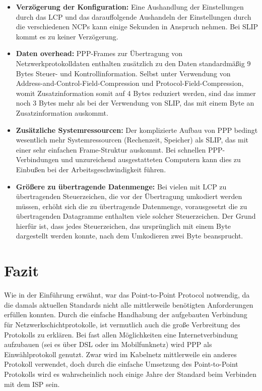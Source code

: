 \documentclass[journal,11pt]{IEEEtran}
\begin{document}
\begin{itemize}
\item \textbf{Verzögerung der Konfiguration:} Eine Aushandlung der Einstellungen durch das LCP und das darauffolgende Aushandeln der Einstellungen durch die verschiedenen NCPs kann einige Sekunden in Anspruch nehmen. Bei SLIP kommt es zu keiner Verzögerung.
\item \textbf{Daten overhead:} PPP-Frames zur Übertragung von Netzwerkprotokolldaten enthalten zusätzlich zu den Daten standardmäßig 9 Bytes Steuer- und Kontrollinformation. Selbst unter Verwendung von Address-and-Control-Field-Compression und Protocol-Field-Compression, womit Zusatzinformation somit auf 4 Bytes reduziert werden, sind das immer noch 3 Bytes mehr als bei der Verwendung von SLIP, das mit einem Byte an Zusatzinformation auskommt.
\item \textbf{Zusätzliche Systemressourcen:} Der komplizierte Aufbau von PPP bedingt wesentlich mehr Systemressourcen (Rechenzeit, Speicher) als SLIP, das mit einer sehr einfachen Frame-Struktur auskommt. Bei schnellen PPP-Verbindungen und unzureichend ausgestatteten Computern kann dies zu Einbußen bei der Arbeitsgeschwindigkeit führen.
\item \textbf{Größere zu übertragende Datenmenge:} Bei vielen mit LCP zu übertragenden Steuerzeichen, die vor der Übertragung umkodiert werden müssen, erhöht sich die zu übertragende Datenmenge, vorausgesetzt die zu übertragenden Datagramme enthalten viele solcher Steuerzeichen. Der Grund hierfür ist, dass jedes Steuerzeichen, das ursprünglich mit einem Byte dargestellt werden konnte, nach dem Umkodieren zwei Byte beansprucht. 
\end{itemize}
%
\section{Fazit} 
Wie in der Einf\"uhrung erw\"ahnt, war das Point-to-Point Protocol notwendig, da die damals aktuellen Standards nicht alle mittlerweile ben\"otigten Anforderungen erf\"ullen konnten. Durch die einfache Handhabung der aufgebauten Verbindung f\"ur Netzwerkschichtprotokolle, ist vermutlich auch die große Verbreitung des Protokolls zu erkl\"aren. Bei fast allen M\"oglichkeiten eine Internetverbindung aufzubauen (sei es \"uber DSL oder im Mobilfunknetz) wird PPP als Einw\"ahlprotokoll genutzt. Zwar wird im Kabelnetz mittlerweile ein anderes Protokoll verwendet, doch durch die einfache Umsetzung des Point-to-Point Protokolls wird es wahrscheinlich noch einige Jahre der Standard beim Verbinden mit dem ISP sein.
\end{document}
